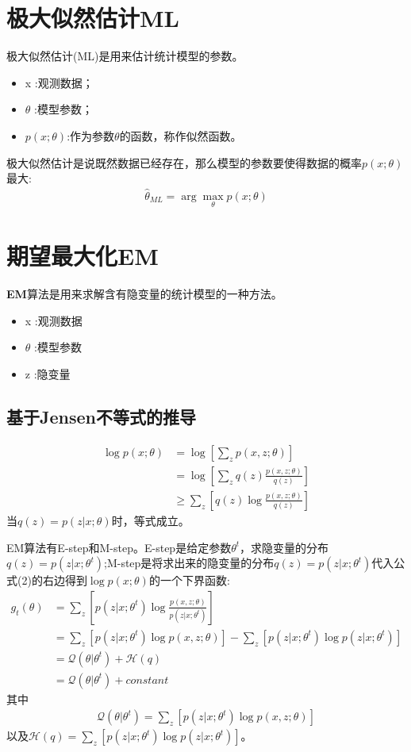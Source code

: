 \documentclass[UTF8]{ctexart}
\newenvironment{pitemize}{
	\vspace{-3mm}
	\begin{itemize}
		\setlength{\itemsep}{1pt}
		\setlength{\parskip}{0pt}
		\setlength{\parsep}{0pt}
	}{\end{itemize}}
\begin{document}
\section{极大似然估计ML}
极大似然估计(ML)是用来估计统计模型的参数。
\begin{pitemize}
	\item x :观测数据；
	\item $\theta$ :模型参数；
    \item $p(x;\theta)$:作为参数$\theta$的函数，称作似然函数。
\end{pitemize}
极大似然估计是说既然数据已经存在，那么模型的参数要使得数据的概率$p(x;\theta)$最大:
\begin{align}
  \hat{\theta}_{ML} = \arg\max\limits_{\theta} p(x;\theta) \tag{1}
\end{align}

\section{期望最大化EM}
\textbf{EM}算法是用来求解含有隐变量的统计模型的一种方法。

\begin{pitemize}
	\item x :观测数据
	\item $\theta$ :模型参数
	\item z :隐变量
\end{pitemize}
\subsection{基于Jensen不等式的推导}

\begin{align*}
    \log p(x;\theta) &= \log\left[\sum_{z}p(x,z;\theta)\right] \\
    &= \log\left[\sum_{z}q(z)\frac{p(x,z;\theta)}{q(z)}\right] \\
    &\geq \sum_{z}\left[q(z)\log\frac{p(x,z;\theta)}{q(z)}\right] \tag{2}
\end{align*}
当$q(z)=p(z|x;\theta)$时，等式成立。

EM算法有E-step和M-step。E-step是给定参数$\theta^{t}$，求隐变量的分布$q(z)=p(z|x;\theta^{t})$;M-step是将求出来的隐变量的分布$q(z)=p(z|x;\theta^{t})$代入公式(2)的右边得到$\log p(x;\theta)$的一个下界函数:
\begin{align*}
    g_{t}(\theta) &= \sum_{z}\left[p(z|x;\theta^{t})\log\frac{p(x,z;\theta)}{p(z|x;\theta^{t})}\right] \\
    &= \sum_{z}\left[p(z|x;\theta^t)\log p(x, z;\theta)\right] - \sum_{z}\left[p(z|x;\theta^t)\log p(z|x;\theta^t)\right] \\
    &= \mathcal{Q}(\theta|\theta^t) + \mathcal{H}(q) \\
    &= \mathcal{Q}(\theta|\theta^t) + constant \tag{3}
\end{align*}
其中
\begin{align}
  \mathcal{Q}(\theta|\theta^t)=\sum_{z}\left[p(z|x;\theta^t)\log p(x, z;\theta)\right] \tag{4}
\end{align}
以及$\mathcal{H}(q)= \sum_{z}\left[p(z|x;\theta^t)\log p(z|x;\theta^t)\right]$。
\end{document}
